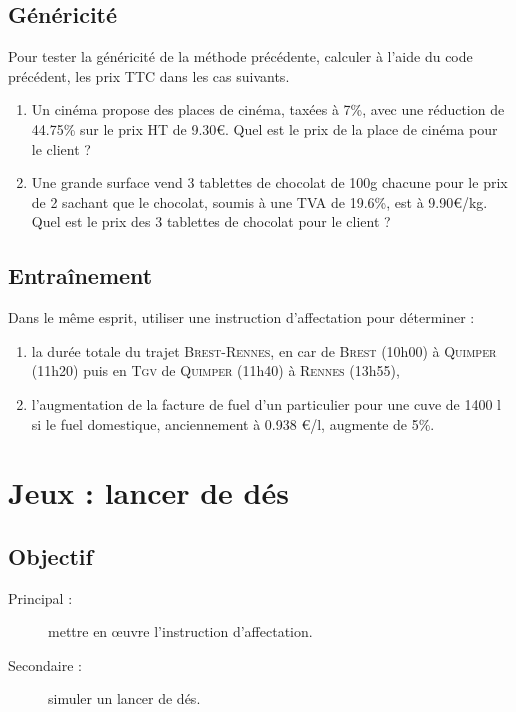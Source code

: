 \subsection{Généricité}\label{affectation:vie-courante:genericite}
Pour tester la généricité de la méthode précédente, 
calculer à l'aide du code \python{} précédent, les prix TTC dans les cas suivants.
\begin{enumerate}
\item Un cinéma propose des places de cinéma, taxées à 7\%, avec une réduction de 44.75\% 
	sur le prix HT de 9.30\euro. Quel est le prix de la place de cinéma pour le client ?
\item Une grande surface vend 3 tablettes de chocolat de 100g chacune pour le prix de 2
	sachant que le chocolat, soumis à une TVA de 19.6\%, est à 9.90\euro/kg.
	Quel est le prix des 3 tablettes de chocolat pour le client ?
\end{enumerate}

\subsection{Entraînement}\label{affectation:vie-courante:entrainement}
Dans le même esprit, utiliser une instruction d'affectation pour déterminer :
\begin{enumerate}
\item la durée totale du trajet \textsc{Brest}-\textsc{Rennes}, 
	en car de \textsc{Brest} (10h00) à \textsc{Quimper} (11h20)
	puis en \textsc{Tgv} de \textsc{Quimper} (11h40) à \textsc{Rennes} (13h55),
\item l'augmentation de la facture de fuel d'un particulier pour une cuve de 1400 l 
	si le fuel domestique, anciennement à 0.938 \euro/l, augmente de 5\%.
\end{enumerate}

\section{Jeux : lancer de dés}

\subsection{Objectif}\label{affectation:jeux:objectif}
\begin{description}
\item[Principal : ] mettre en \oe uvre l'instruction d'affectation.
\item[Secondaire :] simuler un lancer de dés.
\end{description}


